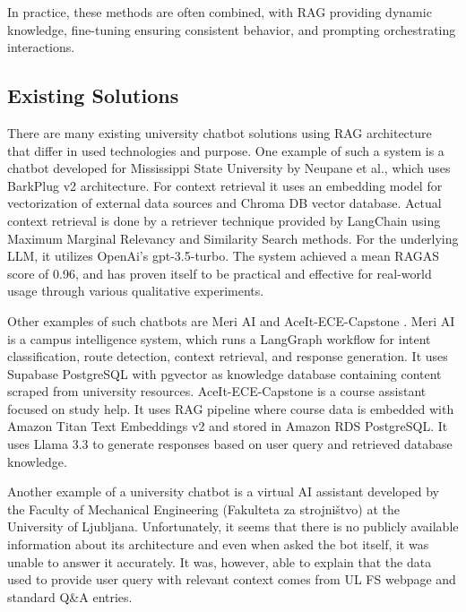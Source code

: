 \documentclass[fleqn,moreauthors,10pt]{ds_report}
\begin{document}
In practice, these methods are often combined, with RAG \cite{lewis2020retrieval} providing dynamic knowledge, fine-tuning ensuring consistent behavior, and prompting orchestrating interactions.

\subsection*{Existing Solutions}
There are many existing university chatbot solutions using RAG architecture that differ in used technologies and purpose.
One example of such a system is a chatbot developed for Mississippi State University by Neupane et al., which uses BarkPlug v2 \cite{neupane2024questions} architecture. For context retrieval it uses an embedding model for vectorization of external data sources and Chroma DB vector database. Actual context retrieval is done by a retriever technique provided by LangChain \cite{langChain} using Maximum Marginal Relevancy and Similarity Search methods. For the underlying LLM, it utilizes OpenAi's gpt-3.5-turbo. The system achieved a mean RAGAS score of 0.96, and has proven itself to be practical and effective for real-world usage through various qualitative experiments.

Other examples of such chatbots are Meri AI \cite{meriAi} and AceIt-ECE-Capstone \cite{aceIt}. Meri AI \cite{meriAi} is a campus intelligence system, which runs a LangGraph workflow \cite{langChain} for intent classification, route detection, context retrieval, and response generation. It uses Supabase PostgreSQL with pgvector as knowledge database containing content scraped from university resources.
AceIt-ECE-Capstone \cite{aceIt} is a course assistant focused on study help. It uses RAG \cite{lewis2020retrieval} pipeline where course data is embedded with Amazon Titan Text Embeddings v2 and stored in Amazon RDS PostgreSQL. It uses Llama 3.3 to generate responses based on user query and retrieved database knowledge.

Another example of a university chatbot is a virtual AI assistant developed by the Faculty of Mechanical Engineering (Fakulteta za strojništvo) at the University of Ljubljana. Unfortunately, it seems that there is no publicly available information about its architecture and even when asked the bot itself, it was unable to answer it accurately. It was, however, able to explain that the data used to provide user query with relevant context comes from UL FS webpage and standard Q\&A entries.


\end{document}
